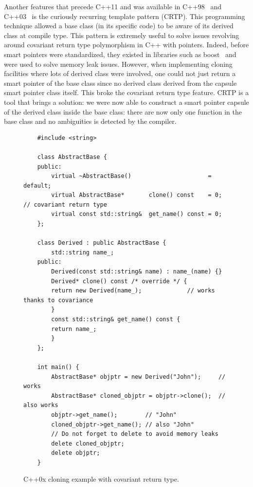 Another features that precede C++11 and was available in C++98~\parencite{iso.1998.cpp} and
C++03~\parencite{iso.2003.cpp} is the curiously recurring template pattern (CRTP). This programming technique allowed a
base class (in its specific code) to be aware of its derived class at compile type. This pattern is extremely useful to
solve issues revolving around covariant return type polymorphism in C++ with pointers. Indeed, before smart pointers
were standardized, they existed in libraries such as boost~\parencite{boost.2021} and were used to solve memory leak
issues. However, when implementing cloning facilities where lots of derived class were involved, one could not just
return a smart pointer of the base class since no derived class derived from the capsule smart pointer class itself.
This broke the covariant return type feature. CRTP is a tool that brings a solution: we were now able to construct a
smart pointer capsule of the derived class inside the base class: there are now only one function in the base class and
no ambiguities is detected by the compiler.

\begin{figure}[tbh]
  \centering
  \begin{verbatim}
    #include <string>

    class AbstractBase {
    public:
        virtual ~AbstractBase()                      = default;
        virtual AbstractBase*       clone() const    = 0; // covariant return type
        virtual const std::string&  get_name() const = 0;
    };

    class Derived : public AbstractBase {
        std::string name_;
    public:
        Derived(const std::string& name) : name_(name) {}
        Derived* clone() const /* override */ {
        return new Derived(name_);             // works thanks to covariance
        }
        const std::string& get_name() const {
        return name_;
        }
    };

    int main() {
        AbstractBase* objptr = new Derived("John");     // works
        AbstractBase* cloned_objptr = objptr->clone();  // also works
        objptr->get_name();        // "John"
        cloned_objptr->get_name(); // also "John"
        // Do not forget to delete to avoid memory leaks
        delete cloned_objptr;
        delete objptr;
    }
  \end{verbatim}
  \caption{C++0x cloning example with covariant return type.}
  \label{fig.gen.crtp.work}
\end{figure}

